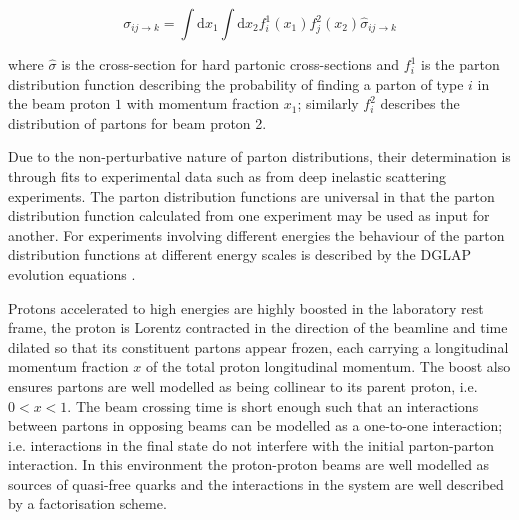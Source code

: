 \begin{equation}
	\sigma_{ij\rightarrow k} = \int \mathrm{d}x_1 \int \mathrm{d}x_2 f_i^1(x_1)f_j^2(x_2) \hat{\sigma}_{ij \rightarrow k}
\end{equation}

where $\hat{\sigma}$ is the cross-section for hard partonic cross-sections and $f_i^1$ is the parton distribution function describing the probability of finding a parton of type $i$ in the beam proton $1$ with momentum fraction $x_1$; similarly $f_i^2$ describes the distribution of partons for beam proton 2.


Due to the non-perturbative nature of parton distributions, their determination is through fits to experimental data such as from deep inelastic scattering experiments. The parton distribution functions are universal in that the parton distribution function calculated from one experiment may be used as input for another. For experiments involving different energies the behaviour of the parton distribution functions at different energy scales is described by the DGLAP evolution equations \cite{Altarelli:1977zs}. 

Protons accelerated to high energies are highly boosted in the laboratory rest frame, the proton is Lorentz contracted in the direction of the beamline and time dilated so that its constituent partons appear frozen, each carrying a longitudinal momentum fraction $x$ of the total proton longitudinal momentum. The boost also ensures partons are well modelled as being collinear to its parent proton, i.e. $0 < x < 1$. The beam crossing time is short enough such that an interactions between partons in opposing beams can be modelled as a one-to-one interaction; i.e. interactions in the final state do not interfere with the initial parton-parton interaction. In this environment the proton-proton beams are well modelled as sources of quasi-free quarks and the interactions in the system are well described by a factorisation scheme.

%


